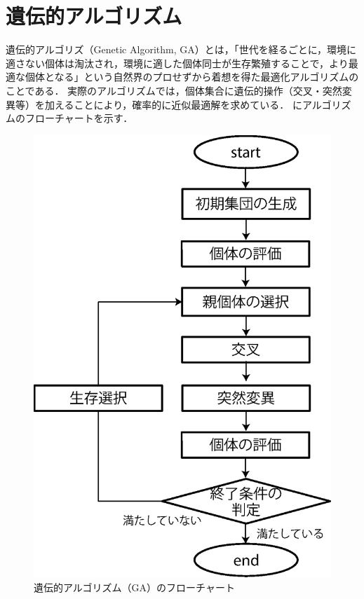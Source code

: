 \documentclass[../main/main]{subfiles}
\begin{document}
\section{遺伝的アルゴリズム}
\quad 遺伝的アルゴリズ（Genetic Algorithm, GA）とは，「世代を経るごとに，環境に適さない個体は淘汰され，環境に適した個体同士が生存繁殖することで，より最適な個体となる」という自然界のプロせずから着想を得た最適化アルゴリズムのことである．
実際のアルゴリズムでは，個体集合に遺伝的操作（交叉・突然変異等）を加えることにより，確率的に近似最適解を求めている．
にアルゴリズムのフローチャートを示す．

\vspace{0.3in}
\begin{figure}[htbp]
\begin{center}
\includegraphics[width=0.6\linewidth]{../figures/flowchart.eps}
\end{center}
\caption{遺伝的アルゴリズム（GA）のフローチャート}
\label{GAflow}
\end{figure}
\afterpage{\clearpage}
\end{document}
